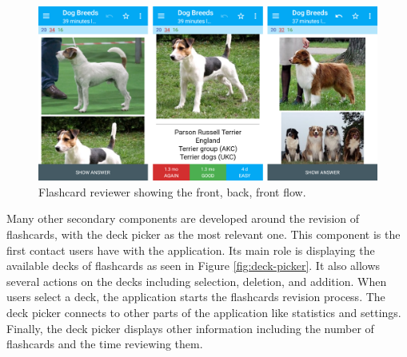 \begin{figure}[htb]
    \vskip 5mm
        \begin{center}
            \includegraphics[scale=0.28]{./Figures/reviewer.png}
            \caption{Flashcard reviewer showing the front, back, front flow.}
            \label{fig:front-back-assess}
        \end{center}
    \vskip -5mm
\end{figure}

Many other secondary components are developed around the revision of flashcards, with the deck picker as the most relevant one. This component is the first contact users have with the application. Its main role is displaying the available decks of flashcards as seen in Figure \ref{fig:deck-picker}. It also allows several actions on the decks including selection, deletion, and addition. When users select a deck, the application starts the flashcards revision process. The deck picker connects to other parts of the application like statistics and settings. Finally, the deck picker displays other information including the number of flashcards and the time reviewing them.

